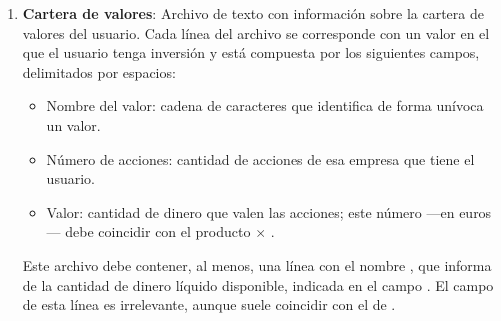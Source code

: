 \documentclass[a4paper, 11pt, titlepage]{article}
\begin{document}
    \begin{enumerate}
        \item \textbf{Cartera de valores}: Archivo de texto con información sobre la cartera de valores del usuario. Cada línea del archivo se corresponde con un valor en el que el usuario tenga inversión y está compuesta por los siguientes campos, delimitados por espacios:
        \begin{itemize}
            \item Nombre del valor: cadena de caracteres que identifica de forma unívoca un valor.
            \item Número de acciones: cantidad de acciones de esa empresa que tiene el usuario.
            \item Valor: cantidad de dinero que valen las acciones; este número ---en euros--- debe coincidir con el producto  $\times$ .
        \end{itemize}
        Este archivo debe contener, al menos, una línea con el nombre , que informa de la cantidad de dinero líquido disponible, indicada en el campo . El campo  de esta línea es irrelevante, aunque suele coincidir con el de .


\end{enumerate}
\end{document}
